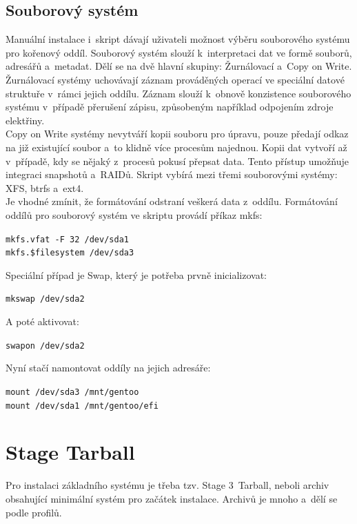 \documentclass[12pt,a4paper,twoside,]{article}
\begin{document}
{\subsection{\textsf{Souborový systém}}\hypertarget{Souborový systém}{}
Manuální instalace i~skript dávají uživateli možnost výběru souborového systému pro kořenový oddíl.
Souborový systém slouží k~interpretaci dat ve formě souborů, adresářů a~metadat. Dělí se na dvě hlavní skupiny: Žurnálovací a~Copy on Write.\\
Žurnálovací systémy uchovávají záznam prováděných operací ve speciální datové struktuře v~rámci jejich oddílu. 
Záznam slouží k~obnově konzistence souborového systému v~případě přerušení zápisu, způsobeným například odpojením zdroje elektřiny. \\
Copy on Write systémy nevytváří kopii souboru pro úpravu, pouze předají odkaz na již existující soubor a~to klidně více procesům najednou.
Kopii dat vytvoří až v~případě, kdy se nějaký z~procesů pokusí přepsat data. Tento přístup umožňuje integraci snapshotů a~RAIDů.
Skript vybírá mezi třemi souborovými systémy: XFS, btrfs a~ext4. \\Je vhodné zmínit, že formátování odstraní veškerá data z~oddílu. 
Formátování oddílů pro souborový systém ve skriptu provádí příkaz mkfs: 

\texttt{mkfs.vfat -F 32 /dev/sda1}\\
\texttt{\hspace*{1.5em}mkfs.\$filesystem /dev/sda3}

\hspace*{-1.5em}Speciální případ je Swap, který je potřeba prvně inicializovat: 

\texttt{mkswap /dev/sda2}

\hspace*{-1.5em}A poté aktivovat:

\texttt{swapon /dev/sda2}

\hspace*{-1.5em}Nyní stačí namontovat oddíly na jejich adresáře:

\texttt{mount /dev/sda3 /mnt/gentoo}\\
\texttt{\hspace*{1.5em}mount /dev/sda1 /mnt/gentoo/efi}

\newpage
\section{\textsf{Stage Tarball}}
{Pro instalaci základního systému je třeba tzv. Stage 3~Tarball, neboli archiv obsahující
minimální systém pro začátek instalace. Archivů je mnoho a~dělí se podle profilů.

}}
\end{document}
